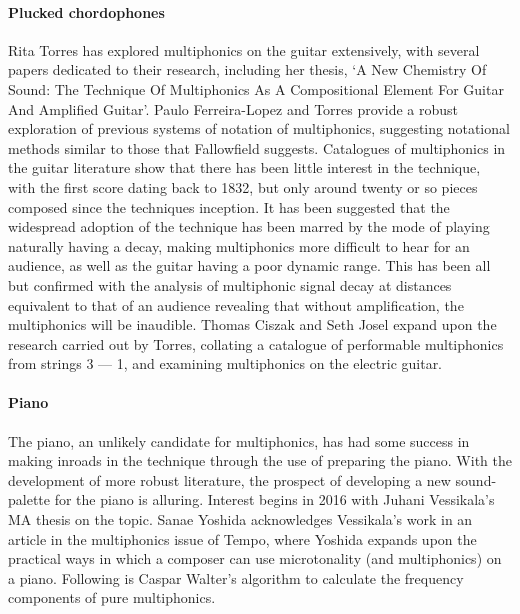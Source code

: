\paragraph{Plucked chordophones}
Rita Torres has explored multiphonics on the guitar extensively, with several papers dedicated to their research, including her thesis, `A New Chemistry Of Sound: The Technique Of Multiphonics As A Compositional Element For Guitar And Amplified Guitar'.\autocite{torresMultiphonicsCompositionalElement2012}
Paulo Ferreira-Lopez and Torres provide a robust exploration of previous systems of notation of multiphonics, suggesting notational methods similar to those that Fallowfield suggests.\autocite{ferreira-lopesGuitarMultiphonicsNotations}
Catalogues of multiphonics in the guitar literature show that there has been little interest in the technique, with the first score dating back to 1832, but only around twenty or so pieces composed since the techniques inception.\autocite[80--82]{torresSoundWorldGuitar2018}
It has been suggested that the widespread adoption of the technique has been marred by the mode of playing naturally having a decay, making multiphonics more difficult to hear for an audience, as well as the guitar having a poor dynamic range.\autocite[21--22]{Torres2014TowardsOT}
This has been all but confirmed with the analysis of multiphonic signal decay at distances equivalent to that of an audience revealing that without amplification, the multiphonics will be inaudible.\autocite[279]{torresGuitarMultiphonicsInfluence2014}
Thomas Ciszak and Seth Josel expand upon the research carried out by Torres, collating a catalogue of performable multiphonics from strings 3 --- 1, and examining multiphonics on the electric guitar.\autocite{ciszakNeonLightMultiphonic2020}

\paragraph{Piano}
The piano, an unlikely candidate for multiphonics, has had some success in making inroads in the technique through the use of preparing the piano.
With the development of more robust literature, the prospect of developing a new sound-palette for the piano is alluring.
Interest begins in 2016 with Juhani Vessikala's MA thesis on the topic.\autocite{vesikkalaMultiphonicsGrandPiano2016}
Sanae Yoshida acknowledges Vessikala's work in an article in the multiphonics issue of Tempo, where Yoshida expands upon the practical ways in which a composer can use microtonality (and multiphonics) on a piano.\autocite{yoshidaMicrotonalPianoTunedIn2020}
Following is Caspar Walter's algorithm to calculate the frequency components of pure multiphonics.\autocite{casparjohanneswalterVariantsContinuedFraction2019}

